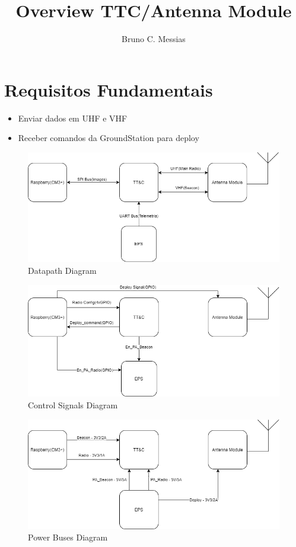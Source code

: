 \documentclass{article}
\title{Overview TTC/Antenna Module}
\author{Bruno C. Messias}
\date{}
\begin{document}
\maketitle

\section{Requisitos Fundamentais}

\begin{itemize}
    \item Enviar dados em UHF e VHF
    \item Receber comandos da GroundStation para deploy
\end{itemize}

\begin{figure}[htbp]
    \centering
    \includegraphics[scale=.5]{Datapath.png}
    \caption{Datapath Diagram}
    \label{datapath}
\end{figure}

\begin{figure}[htbp]
    \centering
    \includegraphics[scale=.5]{Control_signals.png}
    \caption{Control Signals Diagram}
    \label{signals}
\end{figure}

\begin{figure}[htbp]
    \centering
    \includegraphics[scale=.5]{Power_buses.png}
    \caption{Power Buses Diagram}
    \label{power}
\end{figure}
\end{document}
